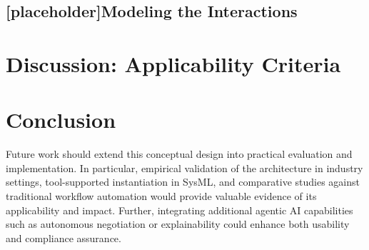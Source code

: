 \subsection{[placeholder]Modeling the Interactions}\label{subse:mod-interactions}

\section{Discussion: Applicability Criteria}\label{sec:app-criteria}
    
\section{Conclusion}
Future work should extend this conceptual design into practical evaluation and implementation. In particular, empirical validation of the architecture in industry settings, tool-supported instantiation in SysML, and comparative studies against traditional workflow automation would provide valuable evidence of its applicability and impact. Further, integrating additional agentic AI capabilities such as autonomous negotiation or explainability could enhance both usability and compliance assurance.
\clearpage